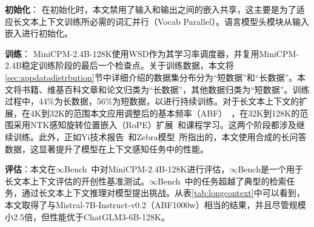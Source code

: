 \textbf{初始化}：
在初始化时，本文禁用了输入和输出之间的嵌入共享，这主要是为了适应长文本上下文训练所必需的词汇并行（Vocab Parallel）。语言模型头模块从输入嵌入进行初始化。

\textbf{训练}：
MiniCPM-2.4B-128K使用WSD作为其学习率调度器，并复用MiniCPM-2.4B稳定训练阶段的最后一个检查点。关于训练数据，本文将\ref{sec:appdatadistrbution}节中详细介绍的数据集分布分为“短数据”和“长数据”。本文将书籍、维基百科文章和论文归类为“长数据”，其他数据归类为“短数据”。训练过程中，44\%为长数据，56\%为短数据，以进行持续训练。对于长文本上下文的扩展，在4K到32K的范围本文应用调整后的基本频率（ABF）~\citep{xiong2023effective}，在32K到128K的范围采用NTK感知旋转位置嵌入（RoPE）扩展~\citep{bloc97_2023_ntk}和课程学习。这两个阶段都涉及继续训练。此外，正如Yi技术报告~\citep{young2024yi}和Zebra模型~\citep{song2023zebra}所指出的，本文使用合成的长问答数据，这显著提升了模型在上下文感知任务中的性能。

\textbf{评估}：本文在$\infty$Bench~\citep{zhang2024infty}中对MiniCPM-2.4B-128K进行评估，$\infty$Bench是一个用于长文本上下文评估的开创性基准测试。$\infty$Bench~\citep{zhang2024infty}中的任务超越了典型的检索任务，通过长文本上下文推理对模型提出挑战。从表\ref{tab:longcontext}中可以看到，本文取得了与Mistral-7B-Instruct-v0.2（ABF1000w）相当的结果，并且尽管规模小2.5倍，但性能优于ChatGLM3-6B-128K。 

